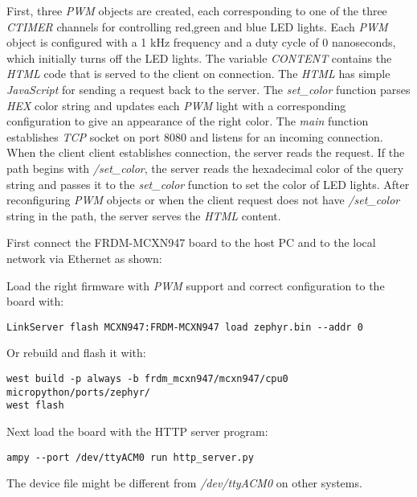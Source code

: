 \documentclass[twoside, 12pt]{article}
\begin{document}
First, three \textit{PWM} objects are created, each corresponding to one of the three 
\textit{CTIMER} channels for controlling red,green and blue LED lights. Each \textit{PWM} 
object is configured with a 1 kHz frequency and a duty cycle of 0 nanoseconds, which 
initially turns off the LED lights. The variable \textit{CONTENT} contains the \textit{HTML} 
code that is served to the client on connection. The \textit{HTML} has simple 
\textit{JavaScript} for sending a request back to the server. The \textit{set\_color} 
function parses \textit{HEX} color string and updates each \textit{PWM} light with a
corresponding configuration to give an appearance of the right color. The \textit{main} 
function establishes \textit{TCP} socket on port 8080 and listens for an incoming
connection. When the client client establishes connection, the server reads the request. If
the path begins with \textit{/set\_color}, the server reads the hexadecimal color of the
query string and passes it to the \textit{set\_color} function to set the color of LED 
lights. After reconfiguring \textit{PWM} objects or when the client request does not have 
\textit{/set\_color} string in the path, the server serves the \textit{HTML} content.

First connect the FRDM-MCXN947 board to the host PC and to the local network via Ethernet as shown:
\newpage
\obrazek
{}

Load the right firmware with \textit{PWM} support and correct configuration to the board with:
\begin{lstlisting}[caption=Load the MicroPython's Zephyr Port with PWM support to the FRDM-MCXN947]
LinkServer flash MCXN947:FRDM-MCXN947 load zephyr.bin --addr 0
\end{lstlisting}

Or rebuild and flash it with:
\begin{lstlisting}[caption=Build and flash the MicroPython's Zephyr Port with PWM support to the FRDM-MCXN947, breaklines=true]
west build -p always -b frdm_mcxn947/mcxn947/cpu0 micropython/ports/zephyr/
west flash
\end{lstlisting}

Next load the board with the HTTP server program:
\begin{lstlisting}[caption=Loading HTTP server to the FRDM-MCXN947 board]
ampy --port /dev/ttyACM0 run http_server.py
\end{lstlisting}
The device file might be different from \textit{/dev/ttyACM0} on other systems.
\end{document}
